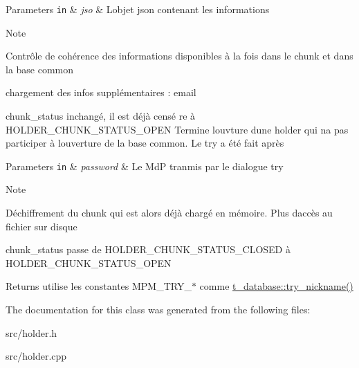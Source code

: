 \begin{DoxyParams}[1]{Parameters}
\mbox{\tt in}  & {\em jso} & L\textquotesingle{}objet json contenant les informations \\
\hline
\end{DoxyParams}
\begin{DoxyNote}{Note}

\begin{DoxyItemize}
\item Contrôle de cohérence des informations disponibles à la fois dans le chunk et dans la base common
\item chargement des infos supplémentaires \+: email
\item chunk\+\_\+status inchangé, il est déjà censé re à H\+O\+L\+D\+E\+R\+\_\+\+C\+H\+U\+N\+K\+\_\+\+S\+T\+A\+T\+U\+S\+\_\+\+O\+P\+EN Termine l\textquotesingle{}ouvture d\textquotesingle{}une holder qui n\textquotesingle{}a pas participer à l\textquotesingle{}ouverture de la base common. Le try a été fait après 
\end{DoxyItemize}
\end{DoxyNote}

\begin{DoxyParams}[1]{Parameters}
\mbox{\tt in}  & {\em password} & Le MdP tranmis par le dialogue try \\
\hline
\end{DoxyParams}
\begin{DoxyNote}{Note}

\begin{DoxyItemize}
\item Déchiffrement du chunk qui est alors déjà chargé en mémoire. Plus d\textquotesingle{}accès au fichier sur disque
\item chunk\+\_\+status passe de H\+O\+L\+D\+E\+R\+\_\+\+C\+H\+U\+N\+K\+\_\+\+S\+T\+A\+T\+U\+S\+\_\+\+C\+L\+O\+S\+ED à H\+O\+L\+D\+E\+R\+\_\+\+C\+H\+U\+N\+K\+\_\+\+S\+T\+A\+T\+U\+S\+\_\+\+O\+P\+EN 
\end{DoxyItemize}
\end{DoxyNote}
\begin{DoxyReturn}{Returns}
utilise les constantes M\+P\+M\+\_\+\+T\+R\+Y\+\_\+$\ast$ comme \hyperlink{classt__database_aa0838d708635fd5edf94ecfc15b31d0c}{t\+\_\+database\+::try\+\_\+nickname()} 
\end{DoxyReturn}


The documentation for this class was generated from the following files\+:\begin{DoxyCompactItemize}
\item 
src/holder.\+h\item 
src/holder.\+cpp\end{DoxyCompactItemize}
